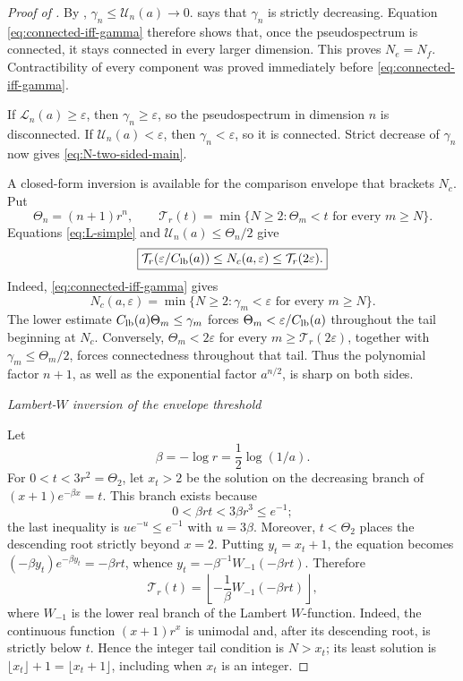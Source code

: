 \documentclass[12pt,anonymous]{iopjournal}
\numberwithin{equation}{section}
\theoremstyle{remark}
\newcommand{\proofstage}[1]{%
  \par\medskip\noindent\textit{#1}\par\nobreak\smallskip}
\begin{document}
\begin{proof}[Proof of ]
By ,
\(\gamma_n\leq\mathcal U_n(a)\to0\).   says that
\(\gamma_n\) is strictly decreasing.  Equation
\eqref{eq:connected-iff-gamma} therefore shows that, once the
pseudospectrum is connected, it stays connected in every larger
dimension.  This proves \(N_e=N_f\).  Contractibility of every component
was proved immediately before \eqref{eq:connected-iff-gamma}.

If \(\mathcal L_n(a)\geq\varepsilon\), then
\(\gamma_n\geq\varepsilon\), so the pseudospectrum in dimension \(n\)
is disconnected.  If \(\mathcal U_n(a)<\varepsilon\), then
\(\gamma_n<\varepsilon\), so it is connected.  Strict decrease of
\(\gamma_n\) now gives \eqref{eq:N-two-sided-main}.

A closed-form inversion is available for the comparison envelope that
brackets \(N_c\).
Put
\[
 \Theta_n=(n+1)r^n,\qquad
 \mathcal T_r(t)=\min\{N\geq2:\Theta_m<t\text{ for every }m\geq N\}.
\]
Equations \eqref{eq:L-simple} and
\(\mathcal U_n(a)\leq\Theta_n/2\) give
\begin{equation}\label{eq:tail-threshold-bounds}
 \boxed{
 \mathcal T_r(\varepsilon/C_{\rm lb}(a))\leq N_c(a,\varepsilon)
 \leq\mathcal T_r(2\varepsilon).}
\end{equation}
Indeed, \eqref{eq:connected-iff-gamma} gives
\[
 N_c(a,\varepsilon)=
 \min\{N\geq2:\gamma_m<\varepsilon\text{ for every }m\geq N\}.
\]
The lower estimate \(C_{\rm lb}(a)\Theta_m\leq\gamma_m\) forces
\(\Theta_m<\varepsilon/C_{\rm lb}(a)\) throughout the tail beginning
at \(N_c\).  Conversely, \(\Theta_m<2\varepsilon\) for every
\(m\geq\mathcal T_r(2\varepsilon)\), together with
\(\gamma_m\leq\Theta_m/2\), forces connectedness throughout that tail.
Thus the polynomial factor \(n+1\), as well as the exponential factor
\(a^{n/2}\), is sharp on both sides.

\proofstage{Lambert-\(W\) inversion of the envelope threshold}
Let
\[
 \beta=-\log r=\frac12\log(1/a).
\]
For \(0<t<3r^2=\Theta_2\), let \(x_t>2\) be the solution on the decreasing
branch of \((x+1)e^{-\beta x}=t\).  This branch exists because
\[
 0<\beta rt<3\beta r^3\leq e^{-1};
\]
the last inequality is \(ue^{-u}\leq e^{-1}\) with \(u=3\beta\).
Moreover, \(t<\Theta_2\) places the descending root strictly beyond
\(x=2\).
Putting \(y_t=x_t+1\), the equation becomes
\((-\beta y_t)e^{-\beta y_t}=-\beta rt\), whence
\(y_t=-\beta^{-1}W_{-1}(-\beta rt)\).  Therefore
\begin{equation}\label{eq:tail-threshold-Lambert}
 \mathcal T_r(t)=\left\lfloor
 -\frac1\beta W_{-1}(-\beta rt)\right\rfloor,
\end{equation}
where \(W_{-1}\) is the lower real branch of the Lambert \(W\)-function.
Indeed, the continuous function \((x+1)r^x\) is unimodal and, after its
descending root, is strictly below \(t\).  Hence the integer tail
condition is \(N>x_t\); its least solution is
\(\lfloor x_t\rfloor+1=\lfloor x_t+1\rfloor\), including when \(x_t\)
is an integer.


\end{proof}
\end{document}
